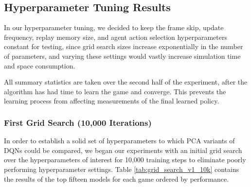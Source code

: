\documentclass[11pt]{article}
\newcommand{\cp}{\texttt{CartPole}}
\begin{document}




\subsection{Hyperparameter Tuning Results}

In our hyperparameter tuning, we decided to keep the frame skip, update frequency, replay memory size, and agent action selection hyperparameters constant for testing, since grid search sizes increase exponentially in the number of parameters, and varying these settings would vastly increase simulation time and space consumption. 

All summary statistics are taken over the second half of the experiment, after the algorithm has had time to learn the game and converge. This prevents the learning process from affecting measurements of the final learned policy.

\subsubsection{First Grid Search (10,000 Iterations)}

In order to establish a solid set of hyperparameters to which PCA variants of DQNs could be compared, we began our experiments with an initial grid search over the hyperparameters of interest for 10,000 training steps to eliminate poorly performing hyperparameter settings. Table \ref{tab:grid_search_v1_10k} contains the results of the top fifteen models for each game ordered by performance.
\end{document}
